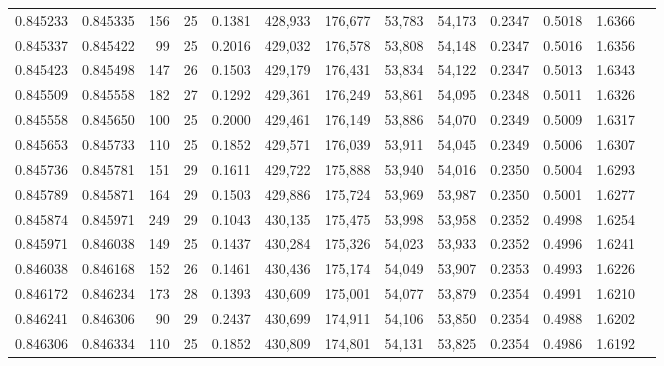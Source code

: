 \begin{tabular}{rrrrrrrrrrrrr}
0.845233 & 0.845335 &   156 &  25 &                                     0.1381 & 428,933 & 176,677 &  53,783 &  54,173 & 0.2347 & 0.5018 & 1.6366 \\
0.845337 & 0.845422 &    99 &  25 &                                     0.2016 & 429,032 & 176,578 &  53,808 &  54,148 & 0.2347 & 0.5016 & 1.6356 \\
0.845423 & 0.845498 &   147 &  26 &                                     0.1503 & 429,179 & 176,431 &  53,834 &  54,122 & 0.2347 & 0.5013 & 1.6343 \\
0.845509 & 0.845558 &   182 &  27 &                                     0.1292 & 429,361 & 176,249 &  53,861 &  54,095 & 0.2348 & 0.5011 & 1.6326 \\
0.845558 & 0.845650 &   100 &  25 &                                     0.2000 & 429,461 & 176,149 &  53,886 &  54,070 & 0.2349 & 0.5009 & 1.6317 \\
0.845653 & 0.845733 &   110 &  25 &                                     0.1852 & 429,571 & 176,039 &  53,911 &  54,045 & 0.2349 & 0.5006 & 1.6307 \\
0.845736 & 0.845781 &   151 &  29 &                                     0.1611 & 429,722 & 175,888 &  53,940 &  54,016 & 0.2350 & 0.5004 & 1.6293 \\
0.845789 & 0.845871 &   164 &  29 &                                     0.1503 & 429,886 & 175,724 &  53,969 &  53,987 & 0.2350 & 0.5001 & 1.6277 \\
0.845874 & 0.845971 &   249 &  29 &                                     0.1043 & 430,135 & 175,475 &  53,998 &  53,958 & 0.2352 & 0.4998 & 1.6254 \\
0.845971 & 0.846038 &   149 &  25 &                                     0.1437 & 430,284 & 175,326 &  54,023 &  53,933 & 0.2352 & 0.4996 & 1.6241 \\
0.846038 & 0.846168 &   152 &  26 &                                     0.1461 & 430,436 & 175,174 &  54,049 &  53,907 & 0.2353 & 0.4993 & 1.6226 \\
0.846172 & 0.846234 &   173 &  28 &                                     0.1393 & 430,609 & 175,001 &  54,077 &  53,879 & 0.2354 & 0.4991 & 1.6210 \\
0.846241 & 0.846306 &    90 &  29 &                                     0.2437 & 430,699 & 174,911 &  54,106 &  53,850 & 0.2354 & 0.4988 & 1.6202 \\
0.846306 & 0.846334 &   110 &  25 &                                     0.1852 & 430,809 & 174,801 &  54,131 &  53,825 & 0.2354 & 0.4986 & 1.6192 \\

\end{tabular}
